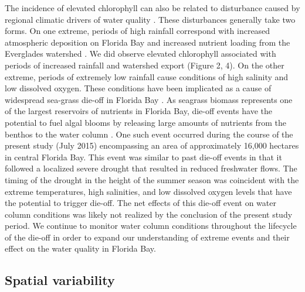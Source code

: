 The incidence of elevated chlorophyll can also be related to disturbance caused by regional climatic drivers of water quality \citep{davis2004importance, briceno_climatic_2009}. These disturbances generally take two forms. On one extreme, periods of high rainfall correspond with increased atmospheric deposition on Florida Bay and increased nutrient loading from the Everglades watershed \citep{rudnick1999phosphorus,sutula2003factors}. We did observe elevated chlorophyll associated with periods of increased rainfall and watershed export (Figure 2, 4).  On the other extreme, periods of extremely low rainfall cause conditions of high salinity and low dissolved oxygen. These conditions have been implicated as a cause of widespread sea-grass die-off in Florida Bay \citep{borum2005potential, zieman1999seagrass}. As seagrass biomass represents one of the largest reservoirs of nutrients in Florida Bay, die-off events have the potential to fuel algal blooms by releasing large amounts of nutrients from the benthos to the water column \citep{fourqurean2012carbon, zhang2004potential}. One such event occurred during the course of the present study (July 2015) encompassing an area of approximately 16,000 hectares in central Florida Bay. This event was similar to past die-off events in that it followed a localized severe drought that resulted in reduced freshwater flows. The timing of the drought in the height of the summer season was coincident with the extreme temperatures, high salinities, and low dissolved oxygen levels that have the potential to trigger die-off. The net effects of this die-off event on water column conditions was likely not realized by the conclusion of the present study period. We continue to monitor water column conditions throughout the lifecycle of the die-off in order to expand our understanding of extreme events and their effect on the water quality in Florida Bay.

\subsection{Spatial variability}
\label{spatialvariability}

